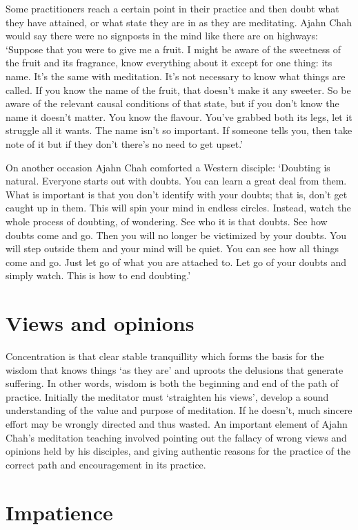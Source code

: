 Some practitioners reach a certain point in their practice and then
doubt what they have attained, or what state they are in as they are
meditating. Ajahn Chah would say there were no signposts in the mind
like there are on highways: `Suppose that you were to give me a fruit. I
might be aware of the sweetness of the fruit and its fragrance, know
everything about it except for one thing: its name. It's the same with
meditation. It's not necessary to know what things are called. If you
know the name of the fruit, that doesn't make it any sweeter. So be
aware of the relevant causal conditions of that state, but if you don't
know the name it doesn't matter. You know the flavour. You've grabbed
both its legs, let it struggle all it wants. The name isn't so
important. If someone tells you, then take note of it but if they don't
there's no need to get upset.'

On another occasion Ajahn Chah comforted a Western disciple: `Doubting
is natural. Everyone starts out with doubts. You can learn a great deal
from them. What is important is that you don't identify with your
doubts; that is, don't get caught up in them. This will spin your mind
in endless circles. Instead, watch the whole process of doubting, of
wondering. See who it is that doubts. See how doubts come and go. Then
you will no longer be victimized by your doubts. You will step outside
them and your mind will be quiet. You can see how all things come and
go. Just let go of what you are attached to. Let go of your doubts and
simply watch. This is how to end doubting.'

\section{Views and opinions}

Concentration is that clear stable tranquillity which forms the basis
for the wisdom that knows things `as they are' and uproots the delusions
that generate suffering. In other words, wisdom is both the beginning
and end of the path of practice. Initially the meditator must
`straighten his views', develop a sound understanding of the value and
purpose of meditation. If he doesn't, much sincere effort may be wrongly
directed and thus wasted. An important element of Ajahn Chah's
meditation teaching involved pointing out the fallacy of wrong views and
opinions held by his disciples, and giving authentic reasons for the
practice of the correct path and encouragement in its practice. 

\section{Impatience}

